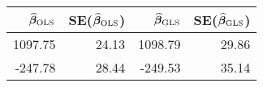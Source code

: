 \begin{table}[ht]
\centering
\begin{tabular}{rrrr}
  \hline
$\widehat{\boldsymbol{\beta}}_{\text{OLS}}$ & SE($\widehat{\boldsymbol{\beta}}_{\text{OLS}}$) & $\widehat{\boldsymbol{\beta}}_{\text{GLS}}$ & SE($\widehat{\boldsymbol{\beta}}_{\text{GLS}}$) \\ 
  \hline
1097.75 & 24.13 & 1098.79 & 29.86 \\ 
  -247.78 & 28.44 & -249.53 & 35.14 \\ 
   \hline
\end{tabular}
\end{table}
